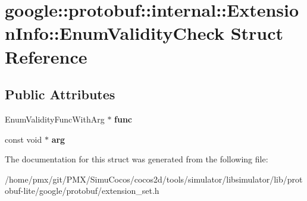 \hypertarget{structgoogle_1_1protobuf_1_1internal_1_1ExtensionInfo_1_1EnumValidityCheck}{}\section{google\+:\+:protobuf\+:\+:internal\+:\+:Extension\+Info\+:\+:Enum\+Validity\+Check Struct Reference}
\label{structgoogle_1_1protobuf_1_1internal_1_1ExtensionInfo_1_1EnumValidityCheck}
\subsection*{Public Attributes}
\begin{DoxyCompactItemize}
\item 
\mbox{\label{structgoogle_1_1protobuf_1_1internal_1_1ExtensionInfo_1_1EnumValidityCheck_a8aefe7974c1ee3259332d029b995f9c5}} 
Enum\+Validity\+Func\+With\+Arg $\ast$ {\bfseries func}
\item 
\mbox{\label{structgoogle_1_1protobuf_1_1internal_1_1ExtensionInfo_1_1EnumValidityCheck_a36d1bf774d39c0dd0382e490329d6dd4}} 
const void $\ast$ {\bfseries arg}
\end{DoxyCompactItemize}


The documentation for this struct was generated from the following file\+:\begin{DoxyCompactItemize}
\item 
/home/pmx/git/\+P\+M\+X/\+Simu\+Cocos/cocos2d/tools/simulator/libsimulator/lib/protobuf-\/lite/google/protobuf/extension\+\_\+set.\+h\end{DoxyCompactItemize}
